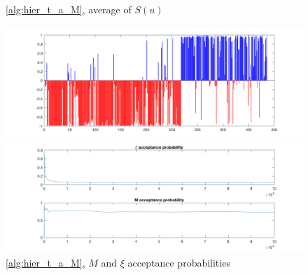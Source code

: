 \documentclass{siamart1116}
\begin{document}
            \begin{figure}[!htb]
            \begin{minipage}{0.48\textwidth}
                \centering
                \caption{\label{fig:voting_hier_u_avg} \cref{alg:hier_t_a_M}, average of $S(u)$}
                \includegraphics[width=\linewidth]{learnM/voting/hier/u_avg.png}
            \end{minipage} \hfill
            \begin{minipage}{0.48\textwidth}
                \centering
                \caption{\label{fig:voting_hier_xi_M_accept} \cref{alg:hier_t_a_M}, $M$ and $\xi$ acceptance probabilities}
                \includegraphics[width=\linewidth]{learnM/voting/hier/accept_prob.png}
            \end{minipage}
            \end{figure}
\end{document}
